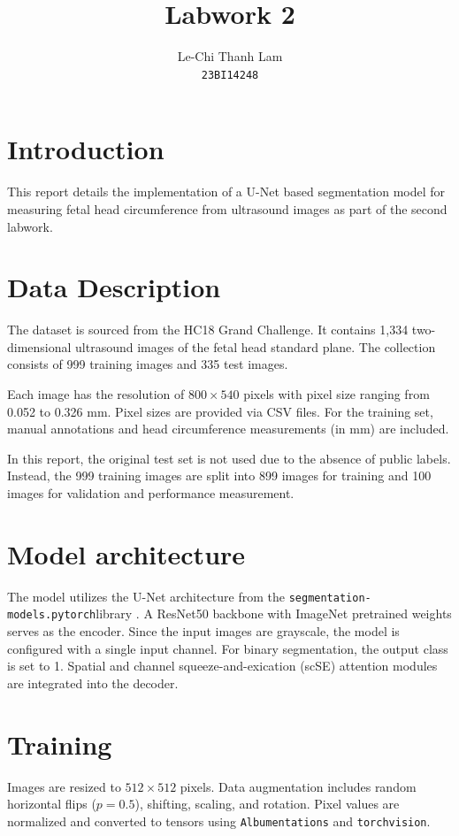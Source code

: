 \documentclass[conference]{IEEEtran} \usepackage{url}
\title{Labwork 2}
\author{
	Le-Chi Thanh Lam\\
	\texttt{23BI14248}
}
\begin{document}
\maketitle

\section{Introduction}

This report details the implementation of a U-Net based segmentation model for
measuring fetal head circumference from ultrasound images as part of the second
labwork.

\section{Data Description}

The dataset is sourced from the HC18 Grand Challenge. It contains 1,334
two-dimensional ultrasound images of the fetal head standard plane. The
collection consists of 999 training images and 335 test images.

Each image has the resolution of $800 \times 540$ pixels with pixel size
ranging from 0.052 to 0.326 mm. Pixel sizes are provided via CSV files. For the
training set, manual annotations and head circumference measurements (in mm)
are included.

In this report, the original test set is not used due to the absence of public
labels. Instead, the 999 training images are split into 899 images for training
and 100 images for validation and performance measurement.

\section{Model architecture}

The model utilizes the U-Net architecture from the
\texttt{segmentation-models.pytorch}library \cite{smp}. A ResNet50 backbone
with ImageNet pretrained weights serves as the encoder. Since the input
images are grayscale, the model is configured with a single input channel.
For binary segmentation, the output class is set to 1. Spatial and channel
squeeze-and-exication (scSE) attention modules are integrated into the decoder.

\section{Training}

Images are resized to $512 \times 512$ pixels. Data augmentation includes random horizontal flips ($p=0.5$), shifting, scaling, and rotation. Pixel values are normalized and converted to tensors using \texttt{Albumentations} and \texttt{torchvision}.
\end{document}
